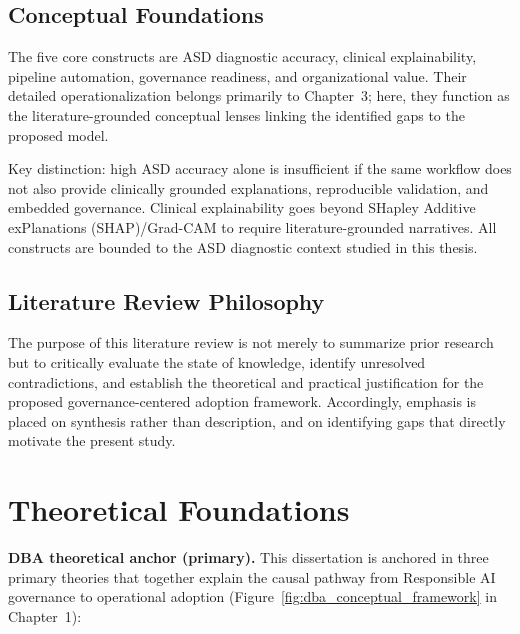 \subsection{Conceptual Foundations}

The five core constructs are ASD diagnostic accuracy, clinical explainability, pipeline automation, governance readiness, and organizational value. Their detailed operationalization belongs primarily to Chapter~3; here, they function as the literature-grounded conceptual lenses linking the identified gaps to the proposed model.


Key distinction: high ASD accuracy alone is insufficient if the same workflow does not also provide clinically grounded explanations, reproducible validation, and embedded governance. Clinical explainability goes beyond SHapley Additive exPlanations (SHAP)/Grad-CAM to require literature-grounded narratives. All constructs are bounded to the ASD diagnostic context studied in this thesis.



\subsection{Literature Review Philosophy}
\label{sec:literature_review_philosophy}

\noindent The purpose of this literature review is not merely to summarize prior research but to critically evaluate the state of knowledge, identify unresolved contradictions, and establish the theoretical and practical justification for the proposed governance-centered adoption framework. Accordingly, emphasis is placed on synthesis rather than description, and on identifying gaps that directly motivate the present study.

\section{Theoretical Foundations}

\noindent\textbf{DBA theoretical anchor (primary).} This dissertation is anchored in three primary theories that together explain the causal pathway from Responsible AI governance to operational adoption (Figure~\ref{fig:dba_conceptual_framework} in Chapter~1):

